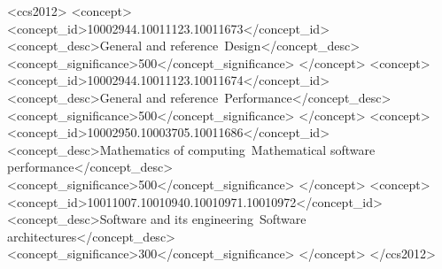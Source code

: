 \documentclass[acmsmall]{acmart}
\begin{document}
\begin{CCSXML}
<ccs2012>
   <concept>
       <concept_id>10002944.10011123.10011673</concept_id>
       <concept_desc>General and reference~Design</concept_desc>
       <concept_significance>500</concept_significance>
       </concept>
   <concept>
       <concept_id>10002944.10011123.10011674</concept_id>
       <concept_desc>General and reference~Performance</concept_desc>
       <concept_significance>500</concept_significance>
       </concept>
   <concept>
       <concept_id>10002950.10003705.10011686</concept_id>
       <concept_desc>Mathematics of computing~Mathematical software performance</concept_desc>
       <concept_significance>500</concept_significance>
       </concept>
   <concept>
       <concept_id>10011007.10010940.10010971.10010972</concept_id>
       <concept_desc>Software and its engineering~Software architectures</concept_desc>
       <concept_significance>300</concept_significance>
       </concept>
 </ccs2012>
\end{CCSXML}




\maketitle
\end{document}
